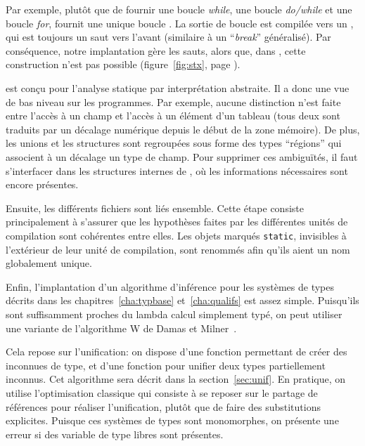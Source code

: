 Par exemple, plutôt que de fournir une boucle \emph{while}, une boucle
\emph{do/while} et une boucle \emph{for}, \newspeak fournit une unique boucle
\phx\npkWhile. La sortie de boucle est compilée vers un \npkGoto{}\cite{goto},
qui est toujours un saut vers l'avant (similaire à un \enquote{\emph{break}}
généralisé). Par conséquence, notre implantation gère les sauts, alors que, dans
\langname, cette construction n'est pas possible (figure~\ref{fig:stx}, page
\pageref{fig:stx}).



\newspeak est conçu pour l'analyse statique par interprétation abstraite. Il a
donc une vue de bas niveau sur les programmes. Par exemple, aucune distinction
n'est faite entre l'accès à un champ et l'accès à un élément d'un tableau (tous
deux sont traduits par un décalage numérique depuis le début de la zone
mémoire). De plus, les unions et les structures sont regroupées sous forme des
types \enquote{régions} qui associent à un décalage un type de champ. Pour
supprimer ces ambiguïtés, il faut s'interfacer dans les structures internes de
\ctonewspeak, où les informations nécessaires sont encore présentes.

Ensuite, les différents fichiers sont liés ensemble. Cette étape consiste
principalement à s'assurer que les hypothèses faites par les différentes unités
de compilation sont cohérentes entre elles. Les objets marqués \texttt{static},
invisibles à l'extérieur de leur unité de compilation, sont renommés afin qu'ils
aient un nom globalement unique.


Enfin, l'implantation d'un algorithme d'inférence pour les systèmes de types
décrits dans les chapitres~\ref{cha:typbase} et~\ref{cha:qualifs} est assez
simple. Puisqu'ils sont suffisamment proches du lambda calcul simplement typé, on
peut utiliser une variante de l'algorithme W de Damas et
Milner~\cite{DamasMilner}.

Cela repose sur l'unification: on dispose d'une fonction permettant de créer des
inconnues de type, et d'une fonction pour unifier deux types partiellement
inconnus. Cet algorithme sera décrit dans la section~\ref{sec:unif}. En
pratique, on utilise l'optimisation classique qui consiste à se
reposer sur le partage de références pour réaliser l'unification, plutôt que de
faire des substitutions explicites. Puisque ces systèmes de types sont
monomorphes, on présente une erreur si des variable de type libres sont
présentes.

